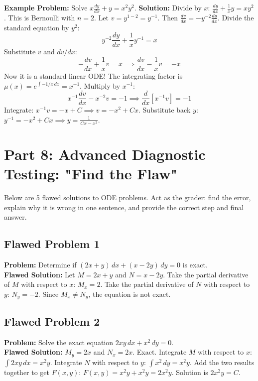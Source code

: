\documentclass[11pt]{article}
\begin{document}
\textbf{Example Problem:} Solve $x \frac{dy}{dx} + y = x^2y^2$.
\textbf{Solution:} 
Divide by $x$: $\frac{dy}{dx} + \frac{1}{x}y = xy^2$. This is Bernoulli with $n=2$.
Let $v = y^{1-2} = y^{-1}$. Then $\frac{dv}{dx} = -y^{-2}\frac{dy}{dx}$.
Divide the standard equation by $y^2$:
\[ y^{-2}\frac{dy}{dx} + \frac{1}{x}y^{-1} = x \]
Substitute $v$ and $dv/dx$:
\[ -\frac{dv}{dx} + \frac{1}{x}v = x \implies \frac{dv}{dx} - \frac{1}{x}v = -x \]
Now it is a standard linear ODE! The integrating factor is $\mu(x) = e^{\int -1/x \, dx} = x^{-1}$.
Multiply by $x^{-1}$:
\[ x^{-1}\frac{dv}{dx} - x^{-2}v = -1 \implies \frac{d}{dx}[x^{-1}v] = -1 \]
Integrate: $x^{-1}v = -x + C \implies v = -x^2 + Cx$.
Substitute back $y$: $y^{-1} = -x^2 + Cx \implies y = \frac{1}{Cx - x^2}$.

\newpage
\section{Part 8: Advanced Diagnostic Testing: "Find the Flaw"}

Below are 5 flawed solutions to ODE problems. Act as the grader: find the error, explain why it is wrong in one sentence, and provide the correct step and final answer.

\subsection*{Flawed Problem 1}
\textbf{Problem:} Determine if $(2x + y) \, dx + (x - 2y) \, dy = 0$ is exact. \\
\textbf{Flawed Solution:} 
Let $M = 2x + y$ and $N = x - 2y$.
Take the partial derivative of $M$ with respect to $x$: $M_x = 2$.
Take the partial derivative of $N$ with respect to $y$: $N_y = -2$.
Since $M_x \neq N_y$, the equation is not exact.

\vspace{2cm}

\subsection*{Flawed Problem 2}
\textbf{Problem:} Solve the exact equation $2xy \, dx + x^2 \, dy = 0$. \\
\textbf{Flawed Solution:}
$M_y = 2x$ and $N_x = 2x$. Exact.
Integrate $M$ with respect to $x$: $\int 2xy \, dx = x^2y$.
Integrate $N$ with respect to $y$: $\int x^2 \, dy = x^2y$.
Add the two results together to get $F(x,y)$:
$F(x,y) = x^2y + x^2y = 2x^2y$.
Solution is $2x^2y = C$.
\end{document}

